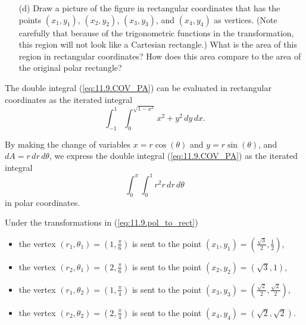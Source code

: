 \begin{pa}
\begin{enumerate}
    \item[(d)] Draw a picture of the figure in rectangular coordinates that has the points $(x_1,y_1)$, $(x_2,y_2)$, $(x_3, y_3)$, and $(x_4,y_4)$ as vertices. (Note carefully that because of the trigonometric functions in the transformation, this region will not look like a Cartesian rectangle.) What is the area of this region in rectangular coordinates? How does this area compare to the area of the original polar rectangle?

    \end{enumerate}
  

\end{pa}


\begin{activitySolution}
    \ba
    \item The double integral (\ref{eq:11.9.COV_PA}) can be evaluated in rectangular coordinates as the iterated integral
\[\int_{-1}^1 \int_{0}^{\sqrt{1-x^2}} x^2 + y^2 \, dy \, dx.\]


    \item By making the change of variables $x = r\cos(\theta)$ and $y = r\sin(\theta)$, and $dA = r \, dr \, d\theta$, we express the double integral (\ref{eq:11.9.COV_PA}) as the iterated integral
\[\int_0^{\pi} \int_0^1 r^2 r \, dr \, d\theta\]
in polar coordinates.

    \item Under the transformations in (\ref{eq:11.9.pol_to_rect})
\begin{itemize}
\item the vertex $(r_1, \theta_1) = \left(1, \frac{\pi}{6}\right)$ is sent to the point $(x_1, y_1) = \left(\frac{\sqrt{3}}{2}, \frac{1}{2}\right)$,
\item the vertex $(r_2, \theta_1) = \left(2, \frac{\pi}{6}\right)$ is sent to the point $(x_2, y_2) = \left(\sqrt{3}, 1 \right)$,
\item the vertex $(r_1, \theta_2) = \left(1, \frac{\pi}{4}\right)$ is sent to the point $(x_3, y_3) = \left(\frac{\sqrt{2}}{2}, \frac{\sqrt{2}}{2}\right)$,
\item the vertex $(r_2, \theta_2) = \left(2, \frac{\pi}{4}\right)$ is sent to the point $(x_4, y_4) = \left(\sqrt{2}, \sqrt{2}\right)$.
\end{itemize}


\end{activitySolution}
